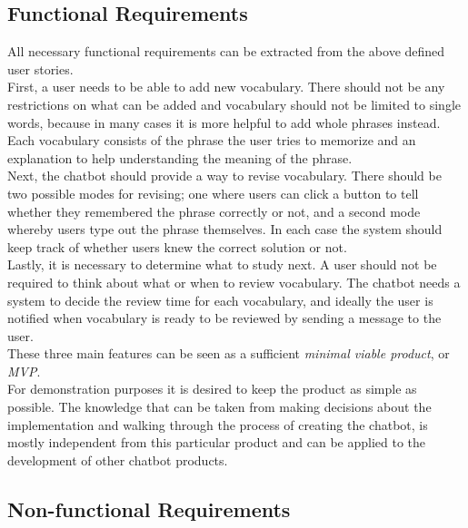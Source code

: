 \subsection{Functional Requirements}
\label{funcreq}

All necessary functional requirements can be extracted from the above defined user stories.
\\
First, a user needs to be able to add new vocabulary.
There should not be any restrictions on what can be added
and vocabulary should not be limited to single words, because in many cases it is more helpful
to add whole phrases instead.
Each vocabulary consists of the phrase the user tries to memorize
and an explanation to help understanding the meaning of the phrase.
\\
Next, the chatbot should provide a way to revise vocabulary.
There should be two possible modes for revising;
one where users can click a button to tell whether they remembered the phrase correctly or not,
and a second mode whereby users type out the phrase themselves.
In each case the system should keep track of whether users knew the correct solution or not.
\\
Lastly, it is necessary to determine what to study next.
A user should not be required to think about what or when to review vocabulary.
The chatbot needs a system to decide the review time for each vocabulary,
and ideally the user is notified when vocabulary is ready to be reviewed by sending a message to the user.
\\
These three main features can be seen as a sufficient \emph{minimal viable product}, or \emph{MVP}.
\\

For demonstration purposes it is desired to keep the product as simple as possible.
The knowledge that can be taken from making decisions about the implementation and walking through the process of creating the chatbot,
is mostly independent from this particular product and can be applied to the development of other chatbot products.


\subsection{Non-functional Requirements}

